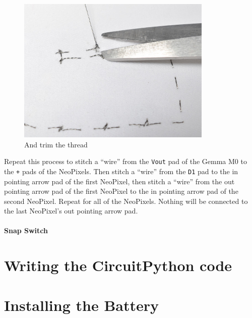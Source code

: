 \documentclass[letterpaper,twoside,12pt]{article}
\begin{document}
\begin{figure}[hbpt]\begin{centering}%
\includegraphics[height=2.75in]{flora_DSC_0125.jpg}
\caption{And trim the thread}
\label{fig:flora_DSC_0125}
\end{centering}\end{figure}
\clearpage
Repeat this process to stitch a ``wire'' from the \texttt{Vout} pad of the
Gemma M0 to the \texttt{+} pads of the NeoPixels. Then stitch a ``wire'' from
the \texttt{D1} pad to the in pointing arrow pad of the first NeoPixel, then
stitch a ``wire'' from the out pointing arrow pad of the first NeoPixel to the 
in pointing arrow pad of the second NeoPixel. Repeat for all of the NeoPixels. 
Nothing will be connected to the last NeoPixel's out pointing arrow pad.
\subsection{Snap Switch}
\part{Writing the CircuitPython code}
\part{Installing the Battery}
\end{document}
